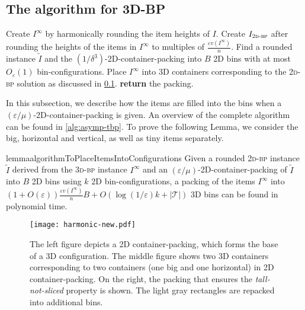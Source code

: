 \documentclass[a4paper,UKenglish,cleveref, autoref, thm-restate]{lipics-v2021}
\newcommand{\eps}{\varepsilon}
\newcommand{\twobp}{\textsc{2d-bp}\xspace}
\newcommand{\tbp}{\textsc{3d-bp}\xspace}
\newcommand{\bigy}{big\xspace}
\newcommand{\tin}{tiny\xspace}
\begin{document}
\subsection{The algorithm for 3D-BP}
\label{subsec:3dbpasymp}
\begin{algorithm}[t]
\DontPrintSemicolon
\caption{Asymptotic $((3/2)T_{\infty}+\eps)$-approximation for 3D-BP with input $I$ and $\eps>0$.}
\label{alg:asymp-tbp}
Create $I^\infty$ by harmonically rounding the item heights of $I$.\;
Create $I_{\twobp}$ after rounding the heights of the items in $I^\infty$ to multiples of $\frac{\eps v(I^{\infty})}{ n}$.\;
Find a rounded instance $\tilde{I}$ and the $(1/\delta^3)$-2D-container-packing into $B$ 2D bins with at most $O_{\eps}(1)$ bin-configurations.\;
Place $I^\infty$ into 3D containers corresponding to the \twobp solution as discussed in \cref{subsec:3dbpasymp}.\;
\textbf{return} the packing. \;
\end{algorithm} 

In this subsection, we describe how the items are filled into the bins when a $(\eps/\mu)$-2D-container-packing is given.
An overview of the complete algorithm can be found in \cref{alg:asymp-tbp}.
To prove the following Lemma, we consider the \bigy, horizontal and vertical, as well as \tin items separately.

\begin{restatable}{lemma}{algorithmToPlaceItemsIntoConfigurations}
\label{lem:alg-to-put-all-items-into-2D-container-packing}
    Given a rounded \twobp instance $\tilde{I}$ derived from the \tbp instance $I^{\infty}$ and an $(\eps/\mu)$-2D-container-packing of $\tilde{I}$ into $B$ 2D bins using $k$ 2D bin-configurations, a packing of the items $I^{\infty}$ into $(1+O(\eps))\frac{\eps v(I^{\infty})}{n} B + O(\log(1/\eps)k +|\mathcal{T}|)$ 3D bins can be found in polynomial time. 
\end{restatable}

\begin{figure}
    \centering
    \texttt{[image: harmonic-new.pdf]}
    \caption{The left figure depicts a 2D container-packing, which forms the base of a 3D configuration. 
    The middle figure shows two 3D containers corresponding to two containers (one big and one horizontal) in 2D container-packing. 
    On the right, the packing that ensures the \emph{tall-not-sliced} property is shown. The light gray rectangles are repacked into additional bins.}
    \label{fig:container}
\end{figure}
\end{document}
